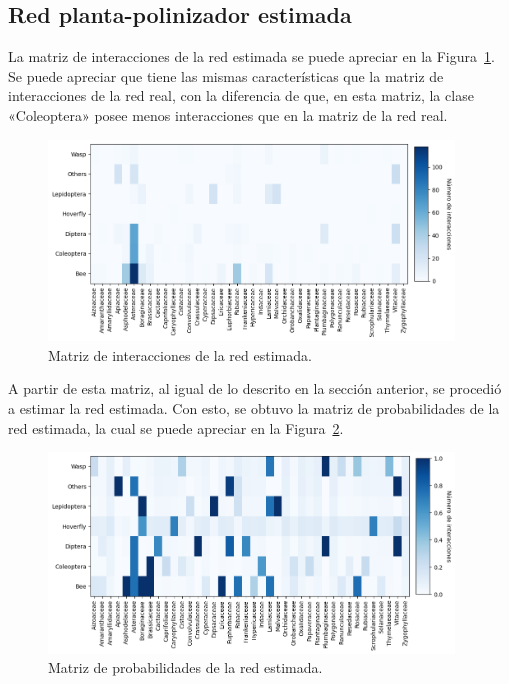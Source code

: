 \subsection{Red planta-polinizador estimada}

La matriz de interacciones de la red estimada se puede apreciar en la Figura~\ref{fig:matriz_interacciones_estimada}. Se puede apreciar que tiene las mismas características que la matriz de interacciones de la red real, con la diferencia de que, en esta matriz, la clase «Coleoptera» posee menos interacciones que en la matriz de la red real.

\begin{figure}[H]
    \centering
    \includegraphics[width=0.96\textwidth]{Figuras/matriz_interacciones_estimada.png}
    \caption{Matriz de interacciones de la red estimada.}
    \label{fig:matriz_interacciones_estimada}
\end{figure}

A partir de esta matriz, al igual de lo descrito en la sección anterior, se procedió a estimar la red estimada. Con esto, se obtuvo la matriz de probabilidades de la red estimada, la cual se puede apreciar en la Figura~\ref{fig:matriz_probabilidades_estimada}.

\begin{figure}[H]
    \centering
    \includegraphics[width=0.96\textwidth]{Figuras/matriz_probabilidades_estimada.png}
    \caption{Matriz de probabilidades de la red estimada.}
    \label{fig:matriz_probabilidades_estimada}
\end{figure}

